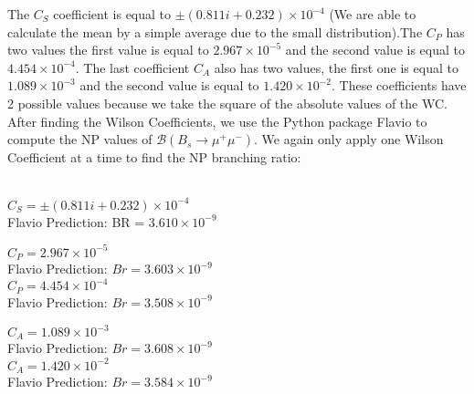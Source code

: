 \documentclass[12pt]{article}
\begin{document}
The $C_S$ coefficient is equal to $\pm (0.811i + 0.232)\times 10^{-4}$ (We are able to calculate the mean by a simple average due to the small distribution).The $C_P$ has two values the first value is equal to $2.967\times 10^{-5}$ and the second value is equal to $4.454 \times 10^{-4}$. The last coefficient $C_{A}$ also has two values, the first one is equal to $1.089 \times 10^{-3}$ and the second value is equal to $1.420 \times 10^{-2}$. These coefficients have 2 possible values because we take the square of the absolute values of the WC. After finding the Wilson Coefficients, we use the Python package Flavio \cite{flavio} to compute the NP values of $\mathcal{B}(B_s\rightarrow \mu^+\mu^-)$. We again only apply one Wilson Coefficient at a time to find the NP branching ratio:\\
\\
\begin{center}
 $C_S = \pm (0.811i + 0.232)\times 10^{-4}$\\
 Flavio Prediction: BR = $3.610 \times 10^{-9}$\\
\end{center}
\begin{center}
$C_{P} = 2.967\times 10^{-5}$ \\
Flavio Prediction: $Br = 3.603 \times 10^{-9}$\\
$C_{P} = 4.454\times 10^{-4}$ \\
Flavio Prediction: $Br = 3.508 \times 10^{-9}$\\
\end{center}
\begin{center}
$C_{A} = 1.089\times 10^{-3}$ \\
Flavio Prediction: $Br = 3.608 \times 10^{-9}$\\
$C_{A} = 1.420\times 10^{-2}$ \\
Flavio Prediction: $Br = 3.584 \times 10^{-9}$\\
\end{center}
\end{document}
